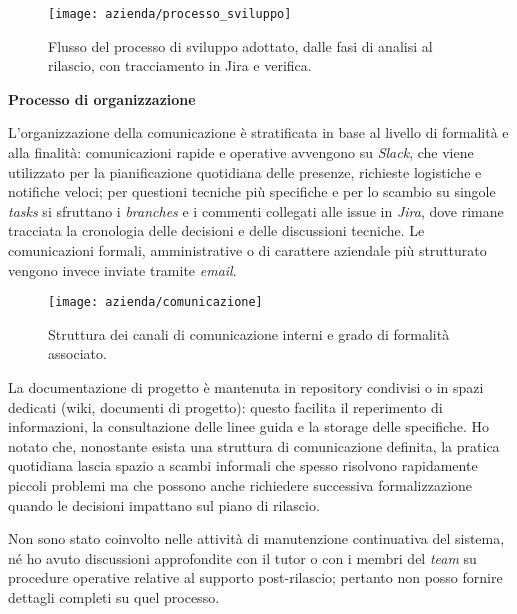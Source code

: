 \begin{figure}[H]
    \centering
    \texttt{[image: azienda/processo\_sviluppo]}
    \caption{Flusso del processo di sviluppo adottato, dalle fasi di analisi al rilascio, con tracciamento in Jira e verifica.}
    \label{fig:processo_sviluppo}
\end{figure}


\medskip
\noindent\textbf{Processo di organizzazione}

L’organizzazione della comunicazione è stratificata in base al livello di formalità e alla finalità: 
comunicazioni rapide e operative avvengono su \emph{Slack}, che viene utilizzato per la pianificazione quotidiana delle presenze, richieste logistiche e notifiche veloci; 
per questioni tecniche più specifiche e per lo scambio su singole \emph{tasks} si sfruttano i \emph{branches} e i commenti collegati alle issue in \emph{Jira}, 
dove rimane tracciata la cronologia delle decisioni e delle discussioni tecniche. Le comunicazioni formali, amministrative o di carattere aziendale più strutturato vengono invece inviate tramite \emph{email}.

\begin{figure}[htbp]
    \centering
    \texttt{[image: azienda/comunicazione]}
    \caption{Struttura dei canali di comunicazione interni e grado di formalità associato.}
    \label{fig:comunicazione}
\end{figure}

La documentazione di progetto è mantenuta in repository condivisi o in spazi dedicati (wiki, documenti di progetto): 
questo facilita il reperimento di informazioni, la consultazione delle linee guida e la storage delle specifiche. 
Ho notato che, nonostante esista una struttura di comunicazione definita, la pratica quotidiana lascia spazio a scambi informali che spesso risolvono rapidamente piccoli 
problemi ma che possono anche richiedere successiva formalizzazione quando le decisioni impattano sul piano di rilascio.

Non sono stato coinvolto nelle attività di manutenzione continuativa del sistema, né ho avuto discussioni approfondite con il tutor o con i membri del \emph{team} su procedure 
operative relative al supporto post-rilascio; pertanto non posso fornire dettagli completi su quel processo.





